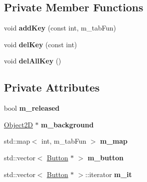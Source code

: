 \subsection*{Private Member Functions}
\begin{DoxyCompactItemize}
\item 
\hypertarget{class_play_state_a44cfc048eb858873879ce05ff0ea1def}{}void {\bfseries add\+Key} (const int, m\+\_\+tab\+Fun)\label{class_play_state_a44cfc048eb858873879ce05ff0ea1def}

\item 
\hypertarget{class_play_state_ace258e5215e35f3c7b245a5cc85ecf98}{}void {\bfseries del\+Key} (const int)\label{class_play_state_ace258e5215e35f3c7b245a5cc85ecf98}

\item 
\hypertarget{class_play_state_acb1a037128b1499a797b355e8e0bf815}{}void {\bfseries del\+All\+Key} ()\label{class_play_state_acb1a037128b1499a797b355e8e0bf815}

\end{DoxyCompactItemize}
\subsection*{Private Attributes}
\begin{DoxyCompactItemize}
\item 
\hypertarget{class_play_state_a190697978b7535b60360c478b94d1666}{}bool {\bfseries m\+\_\+released}\label{class_play_state_a190697978b7535b60360c478b94d1666}

\item 
\hypertarget{class_play_state_aafead5a6d1a207ff9b2536ea7bc08f80}{}\hyperlink{class_object2_d}{Object2\+D} $\ast$ {\bfseries m\+\_\+background}\label{class_play_state_aafead5a6d1a207ff9b2536ea7bc08f80}

\item 
\hypertarget{class_play_state_a6198539b75d9f0505c363d02202a7c50}{}std\+::map$<$ int, m\+\_\+tab\+Fun $>$ {\bfseries m\+\_\+map}\label{class_play_state_a6198539b75d9f0505c363d02202a7c50}

\item 
\hypertarget{class_play_state_abe8682782344f8b71bbf8bec7384428a}{}std\+::vector$<$ \hyperlink{class_button}{Button} $\ast$ $>$ {\bfseries m\+\_\+button}\label{class_play_state_abe8682782344f8b71bbf8bec7384428a}

\item 
\hypertarget{class_play_state_a6f403fd93a3390beaf27d6ced9557f85}{}std\+::vector$<$ \hyperlink{class_button}{Button} $\ast$ $>$\+::iterator {\bfseries m\+\_\+it}\label{class_play_state_a6f403fd93a3390beaf27d6ced9557f85}

\end{DoxyCompactItemize}

